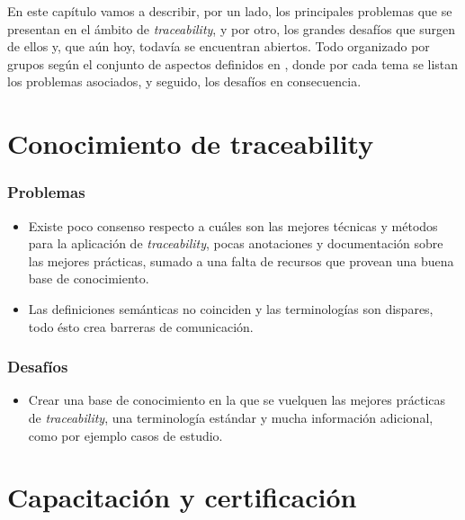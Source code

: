 \documentclass[a4paper,12pt,oneside,spanish]{book}
\begin{document}
En este capítulo vamos a describir, por un lado, los principales problemas que se presentan en el ámbito de \textit{traceability}, y por otro, los grandes desafíos que surgen de ellos y, que aún hoy, todavía se encuentran abiertos. Todo organizado por grupos según el conjunto de aspectos definidos en \cite{Excellence}, donde por cada tema se listan los problemas asociados, y seguido, los desafíos en consecuencia.

\section{Conocimiento de traceability}

\subsubsection{Problemas}

\begin{itemize}[label={$\times$}]

\item Existe poco consenso respecto a cuáles son las mejores técnicas y métodos para la aplicación de \textit{traceability}, pocas anotaciones y documentación sobre las mejores prácticas, sumado a una falta de recursos que provean una buena base de conocimiento.

\item Las definiciones semánticas no coinciden y las terminologías son dispares, todo ésto crea barreras de comunicación.

\end{itemize}

\subsubsection{Desafíos}

\begin{itemize}[label={\checkmark}]

\item Crear una base de conocimiento en la que se vuelquen las mejores prácticas de \textit{traceability}, una terminología estándar y mucha información adicional, como por ejemplo casos de estudio.

\end{itemize}

\section{Capacitación y certificación}
\end{document}

